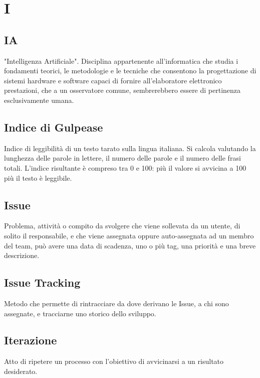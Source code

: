 \section*{I}

\subsection{IA}
"Intelligenza Artificiale". Disciplina appartenente all'informatica che studia i fondamenti teorici, le metodologie e le tecniche che consentono la progettazione di sistemi hardware e software
capaci di fornire all'elaboratore elettronico prestazioni, che a un osservatore comune, sembrerebbero essere di pertinenza esclusivamente umana. 

\subsection{Indice di Gulpease}
Indice di leggibilità di un testo tarato sulla lingua italiana. Si calcola valutando la lunghezza delle parole in lettere, il numero delle parole e il numero delle frasi totali. L'indice risultante è compreso tra 0 e 100: più il valore si avvicina a 100 più il testo è leggibile.

\subsection{Issue}
Problema, attività o compito da svolgere che viene sollevata da un utente, di solito il responsabile, e che viene assegnata oppure auto-assegnata ad un membro del team, può avere una data di scadenza, uno o più tag, una priorità e una breve descrizione.

\subsection{Issue Tracking}
Metodo che permette di rintracciare da dove derivano le Issue, a chi sono assegnate, e tracciarne uno storico dello sviluppo.

\subsection{Iterazione}
Atto di ripetere un processo con l'obiettivo di avvicinarsi a un risultato desiderato.
